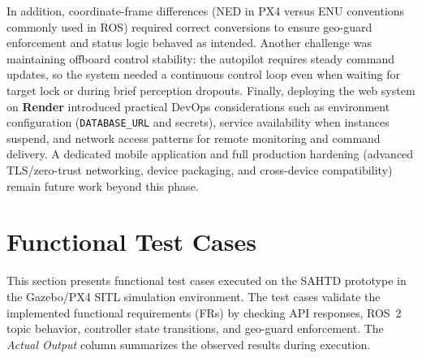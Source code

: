 \documentclass[12pt,a4paper]{report}
\begin{document}
In addition, coordinate-frame differences (\ac{NED} in \ac{PX4} versus \ac{ENU} conventions commonly used in ROS) required correct conversions to ensure geo-guard enforcement and status logic behaved as intended. Another challenge was maintaining offboard control stability: the autopilot requires steady command updates, so the system needed a continuous control loop even when waiting for target lock or during brief perception dropouts. Finally, deploying the web system on \textbf{Render} introduced practical DevOps considerations such as environment configuration (\texttt{DATABASE\_URL} and secrets), service availability when instances suspend, and network access patterns for remote monitoring and command delivery. A dedicated mobile application and full production hardening (advanced TLS/zero-trust networking, device packaging, and cross-device compatibility) remain future work beyond this phase.



\section{Functional Test Cases}
This section presents functional test cases executed on the SAHTD prototype in the Gazebo/\ac{PX4} \ac{SITL} simulation environment. The test cases validate the implemented functional requirements (FRs) by checking API responses, ROS~2 topic behavior, controller state transitions, and geo-guard enforcement. The \textit{Actual Output} column summarizes the observed results during execution.
\end{document}
